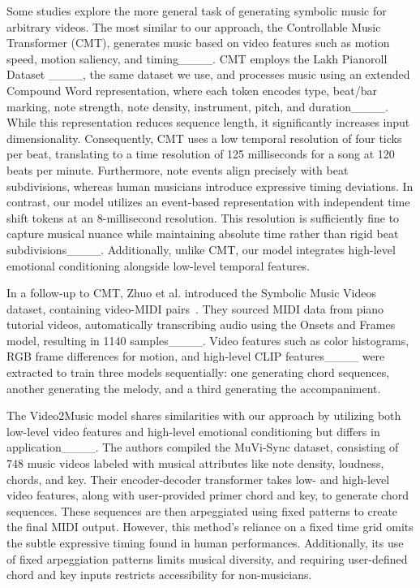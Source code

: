 Some studies explore the more general task of generating symbolic music for arbitrary videos. The most similar to our approach, the Controllable Music Transformer (CMT), generates music based on video features such as motion speed, motion saliency, and timing____. CMT employs the Lakh Pianoroll Dataset ____, the same dataset we use, and processes music using an extended Compound Word representation, where each token encodes type, beat/bar marking, note strength, note density, instrument, pitch, and duration____. While this representation reduces sequence length, it significantly increases input dimensionality. Consequently, CMT uses a low temporal resolution of four ticks per beat, translating to a time resolution of 125 milliseconds for a song at 120 beats per minute. Furthermore, note events align precisely with beat subdivisions, whereas human musicians introduce expressive timing deviations. In contrast, our model utilizes an event-based representation with independent time shift tokens at an 8-millisecond resolution. This resolution is sufficiently fine to capture musical nuance while maintaining absolute time rather than rigid beat subdivisions____. Additionally, unlike CMT, our model integrates high-level emotional conditioning alongside low-level temporal features.

In a follow-up to CMT, Zhuo et al. introduced the Symbolic Music Videos dataset, containing video-MIDI pairs~. They sourced MIDI data from piano tutorial videos, automatically transcribing audio using the Onsets and Frames model, resulting in 1140 samples____. Video features such as color histograms, RGB frame differences for motion, and high-level CLIP features____ were extracted to train three models sequentially: one generating chord sequences, another generating the melody, and a third generating the accompaniment.

The Video2Music model shares similarities with our approach by utilizing both low-level video features and high-level emotional conditioning but differs in application____. The authors compiled the MuVi-Sync dataset, consisting of 748 music videos labeled with musical attributes like note density, loudness, chords, and key. Their encoder-decoder transformer takes low- and high-level video features, along with user-provided primer chord and key, to generate chord sequences. These sequences are then arpeggiated using fixed patterns to create the final MIDI output. However, this method's reliance on a fixed time grid omits the subtle expressive timing found in human performances. Additionally, its use of fixed arpeggiation patterns limits musical diversity, and requiring user-defined chord and key inputs restricts accessibility for non-musicians.

